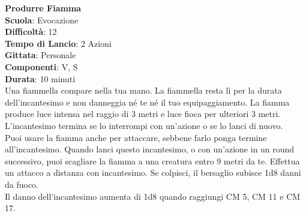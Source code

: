 \begin{multicols}{2}
\medskip\textbf{Produrre Fiamma}\\
\textbf{Scuola}: Evocazione\\
\textbf{Difficoltà}: 12\\
\textbf{Tempo di Lancio}: 2 Azioni\\
\textbf{Gittata}: Personale\\
\textbf{Componenti}: V, S\\
\textbf{Durata}: 10 minuti\\
Una fiammella compare nella tua mano. La fiammella resta lì per la durata dell'incantesimo e non danneggia né te né il tuo equipaggiamento. La fiamma produce luce intensa nel raggio di 3 metri e luce fioca per ulteriori 3 metri. L'incantesimo termina se lo interrompi con un'azione o se lo lanci di nuovo.\\
Puoi usare la fiamma anche per attaccare, sebbene farlo ponga termine all'incantesimo. Quando lanci questo incantesimo, o con un'azione in un round successivo, puoi scagliare la fiamma a una creatura entro 9 metri da te. Effettua un attacco a distanza con incantesimo. Se colpisci, il bersaglio subisce 1d8 danni da fuoco.\\
Il danno dell'incantesimo aumenta di 1d8 quando raggiungi CM 5, CM 11 e CM 17.


\end{multicols}
